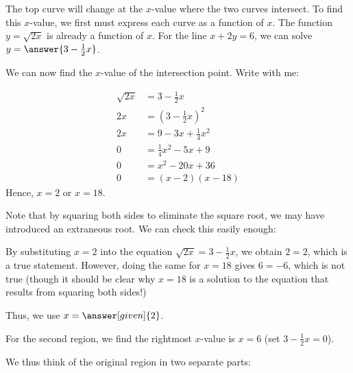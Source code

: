 \documentclass{ximera}
\begin{document}
\begin{example}

The top curve will change at the $x$-value where the two curves intersect.  To find this $x$-value, we first must express each curve as a function of $x$.  The function $y=\sqrt{2x}$ is already a function of $x$.  For the line $x+2y=6$, we can solve $y=\answer{3- \frac{1}{2}x}$.

We can now find the $x$-value of the intersection point. Write with me:

\begin{align*}
\sqrt{2x} &= 3 -\frac{1}{2}x \\
2x &= \left(3 -\frac{1}{2}x\right)^2 \\
2x&= 9-3x+\frac{1}{4} x^2 \\
0 &= \frac{1}{4} x^2 -5x+9  \\
0 &= x^2 -20x+36  \\
0 &= (x-2)(x-18) 
\end{align*}
Hence, $x=2$ or $x=18$.  

Note that by squaring both sides to eliminate the square root, we may have introduced an extraneous root.  We can check this easily enough:

By substituting $x=2$ into the equation $\sqrt{2x} = 3-\frac{1}{2}x$, we obtain $2=2$, which is a true statement.  However, doing the same for $x=18$ gives $6 = -6$, which is not true (though it should be clear why $x=18$ is a solution to the equation that results from squaring both sides!) 

Thus, we use $x=\answer[given]{2}$.  

For the second region, we find the rightmost $x$-value is $x=6$ (set $3-\frac{1}{2}x=0$).

We thus think of the original region in two separate parts:

   \begin{image}
\end{image}
\end{example}
\end{document}
